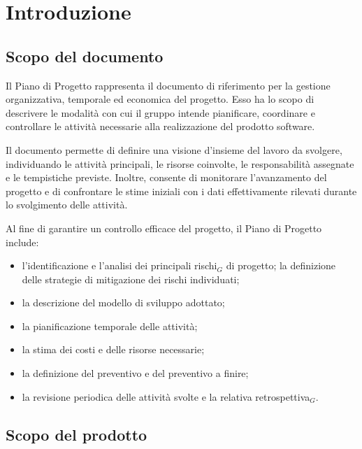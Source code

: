﻿\documentclass[a4paper, 10pt, colorlinks=true, linkcolor=black, urlcolor=blue, citecolor=blue, hidelinks]{article}
\begin{document}
\newpage
{} %
\tableofcontents
\newpage
\newpage



\newpage

\section{Introduzione}

\subsection{Scopo del documento}

Il Piano di Progetto rappresenta il documento di riferimento per la gestione organizzativa, temporale ed economica del progetto. 
Esso ha lo scopo di descrivere le modalità con cui il gruppo intende pianificare, coordinare e controllare le attività necessarie alla realizzazione del prodotto software.

Il documento permette di definire una visione d'insieme del lavoro da svolgere, individuando le attività principali, le risorse coinvolte, le responsabilità assegnate e le tempistiche previste. 
Inoltre, consente di monitorare l'avanzamento del progetto e di confrontare le stime iniziali con i dati effettivamente rilevati durante lo svolgimento delle attività.

Al fine di garantire un controllo efficace del progetto, il Piano di Progetto include:

\begin{itemize}
    \item l'identificazione e l'analisi dei principali rischi$_G$ di progetto; la definizione delle strategie di mitigazione dei rischi individuati;
    \item la descrizione del modello di sviluppo adottato;
    \item la pianificazione temporale delle attività;
    \item la stima dei costi e delle risorse necessarie;
    \item la definizione del preventivo e del preventivo a finire;
    \item la revisione periodica delle attività svolte e la relativa retrospettiva$_G$.
\end{itemize}

\subsection{Scopo del prodotto}
\end{document}
